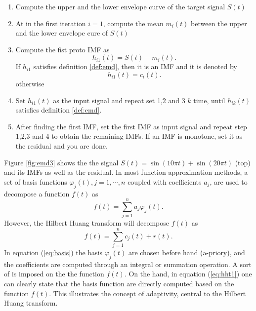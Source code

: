 \documentclass[../Main/thesis.tex]{subfiles}
\begin{document}
\begin{enumerate}
	\item Compute the upper and the lower envelope curve of the target signal $S(t)$
	\item At in the first iteration $i=1$, compute the mean $m_{i}(t)$ between the upper and the lower envelope cure of $S(t)$
	\item Compute the fist proto IMF as 
	\begin{equation}\label{eq:proto}
		h_{i1}(t) = S(t)-m_{i}(t).
	\end{equation}
	If $h_{i1}$ satisfies definition \ref{def:emd}, then it is an IMF and it is denoted by 
	\begin{equation}\label{eq:imf}
		h_{i1}(t) = c_{i}(t).
	\end{equation}
	otherwise
	
	\item Set $h_{i1}(t)$ as the input signal and repeat set 1,2 and 3 $k$ time, until $h_{ik}(t)$ satisfies definition \ref{def:emd}.
	\item After finding the first IMF, set the first IMF as input signal and repeat step 1,2,3 and 4 to obtain the remaining IMFs. If an IMF is monotone, set it as the residual and you are done.
\end{enumerate}
Figure \ref{fig:emd3} shows the the signal  $S(t) = \sin(10 \pi t) + \sin(20 \pi t) $ (top) and its IMFs as well as the residual. In most function approximation methods, a set of basis functions $\varphi_{j}(t), j = 1,\cdots,n$ coupled with coefficients $a_{j}$, are used to decompose a function $f(t)$ as 
\begin{equation}\label{eq:basis}
	f(t) = \sum_{j=1}^{n}a_{j}\varphi_{j}(t).
\end{equation}
However, the Hilbert Huang transform will decompose $f(t)$ as 
\begin{equation}\label{eq:hht1}
f(t) = \sum_{j=1}^{n}c_{j}(t) + r(t).
\end{equation}
In equation (\ref{eq:basis}) the basis $\varphi_{j}(t)$ are chosen before hand (a-priory), and the coefficients are computed through an integral or summation operation. A sort of  is imposed on the the function $f(t)$. On the hand, in equation (\ref{eq:hht1}) one can clearly state that the basis function are directly computed based on the function $f(t)$. This illustrates the concept of adaptivity, central to the Hilbert Huang transform.
\end{document}

